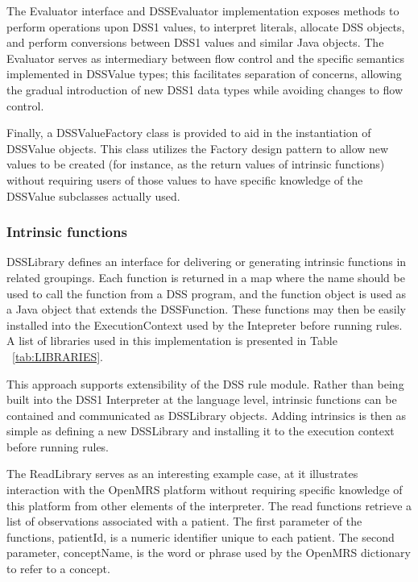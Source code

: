 \documentclass[12pt,letterpaper]{article}
\begin{document}
{The Evaluator interface and DSSEvaluator implementation exposes methods to perform operations upon DSS1 values, to interpret literals, allocate DSS objects, and perform conversions between DSS1 values and similar Java objects. The Evaluator serves as intermediary between flow control and the specific semantics implemented in DSSValue types; this facilitates separation of concerns, allowing the gradual introduction of new DSS1 data types while avoiding changes to  flow control.

Finally, a DSSValueFactory class is provided to aid in the instantiation of DSSValue objects. This class utilizes the Factory design pattern to allow new values to be created (for instance, as the return values of intrinsic functions) without requiring users of those values to have specific knowledge of the DSSValue subclasses actually used.

\subsubsection{Intrinsic functions} \label{sec:INTRINSIC_FUNCTIONS}

DSSLibrary defines an interface for delivering or generating intrinsic functions in related groupings. Each function is returned in a map where the name should be used to call the function from a DSS program, and the function object is used as a Java object that extends the DSSFunction. These functions may then be easily installed into the ExecutionContext used by the Intepreter before running rules. A list of libraries used in this implementation is presented in Table ~\ref{tab:LIBRARIES}.

This approach supports extensibility of the DSS rule module. 
Rather than being built into the DSS1 Interpreter at the language 
level, intrinsic functions can be contained and communicated 
as DSSLibrary objects. Adding intrinsics is then as simple as 
defining a new DSSLibrary and installing it to the execution context before running rules.

The ReadLibrary serves as an interesting example case, at it illustrates interaction with the OpenMRS platform without requiring specific knowledge of this platform from other elements of the interpreter. The read functions retrieve a list of observations associated with a patient. The first parameter of the functions, patientId, is a numeric identifier unique to each patient. The second parameter, conceptName, is the word or phrase used by the OpenMRS dictionary to refer to a concept. 

}
\end{document}
